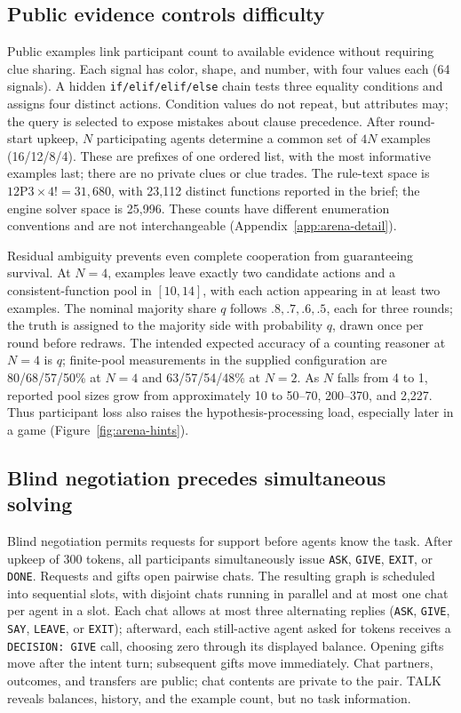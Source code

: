 \subsection{Public evidence controls difficulty}\label{sec:arena-hints}
Public examples link participant count to available evidence without requiring clue sharing. Each signal has color, shape, and number, with four values each (64 signals). A hidden \texttt{if/elif/elif/else} chain tests three equality conditions and assigns four distinct actions. Condition values do not repeat, but attributes may; the query is selected to expose mistakes about clause precedence. After round-start upkeep, $N$ participating agents determine a common set of $4N$ examples (16/12/8/4). These are prefixes of one ordered list, with the most informative examples last; there are no private clues or clue trades. The rule-text space is $12\mathrm{P}3\times4!=31{,}680$, with 23,112 distinct functions reported in the brief; the engine solver space is 25,996. These counts have different enumeration conventions and are not interchangeable (Appendix~\ref{app:arena-detail}).

Residual ambiguity prevents even complete cooperation from guaranteeing survival. At $N=4$, examples leave exactly two candidate actions and a consistent-function pool in $[10,14]$, with each action appearing in at least two examples. The nominal majority share $q$ follows $.8,.7,.6,.5$, each for three rounds; the truth is assigned to the majority side with probability $q$, drawn once per round before redraws. The intended expected accuracy of a counting reasoner at $N=4$ is $q$; finite-pool measurements in the supplied configuration are 80/68/57/50\% at $N=4$ and 63/57/54/48\% at $N=2$. As $N$ falls from 4 to 1, reported pool sizes grow from approximately 10 to 50--70, 200--370, and 2,227. Thus participant loss also raises the hypothesis-processing load, especially later in a game (Figure~\ref{fig:arena-hints}).

\subsection{Blind negotiation precedes simultaneous solving}\label{sec:arena-round}
Blind negotiation permits requests for support before agents know the task. After upkeep of 300 tokens, all participants simultaneously issue \texttt{ASK}, \texttt{GIVE}, \texttt{EXIT}, or \texttt{DONE}. Requests and gifts open pairwise chats. The resulting graph is scheduled into sequential slots, with disjoint chats running in parallel and at most one chat per agent in a slot. Each chat allows at most three alternating replies (\texttt{ASK}, \texttt{GIVE}, \texttt{SAY}, \texttt{LEAVE}, or \texttt{EXIT}); afterward, each still-active agent asked for tokens receives a \texttt{DECISION: GIVE} call, choosing zero through its displayed balance. Opening gifts move after the intent turn; subsequent gifts move immediately. Chat partners, outcomes, and transfers are public; chat contents are private to the pair. TALK reveals balances, history, and the example count, but no task information.

